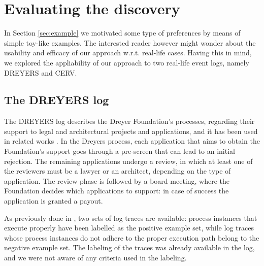 
\section{Evaluating the discovery}
\label{sec:evaluation}


In Section \ref{sec:example} we motivated some type of preferences by means of simple toy-like examples. The interested reader however might wonder about the usability and efficacy of our approach w.r.t. real-life cases. Having this in mind, we explored the appliability of our approach to two real-life event logs, namely DREYERS and CERV.


\subsection{The DREYERS log}
\label{subsec:dreyers}

The DREYERS log describes the Dreyer Foundation’s processes, regarding their support to legal and architectural projects and applications, and it has been used in related works \cite{DBLP:conf/ssci/DeboisS15,DBLP:conf/bpm/SlaatsDB21}. In the Dreyers process, each application that aims to obtain the Foundation's support goes through a pre-screen that can lead to an initial rejection. The remaining applications undergo a review, in which at least one of the reviewers must be a lawyer or an architect, depending on the type of application. The review phase is followed by a board meeting, where the Foundation decides which applications to support: in case of success the application is granted a payout.

As previously done in \cite{DBLP:conf/bpm/SlaatsDB21}, two sets of log traces are available: process instances that execute properly have been labelled as the positive example set, while log traces whose process instances do not adhere to the proper execution path belong to the negative example set. The labeling of the traces was already available in the log, and we were not aware of any criteria used in the labeling.

